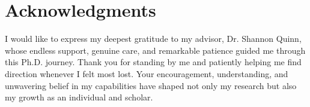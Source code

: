 \documentclass[./dissertation.tex]{subfiles}
\begin{document}
\chapter*{Acknowledgments}

I would like to express my deepest gratitude to my advisor, Dr. Shannon Quinn, whose endless support, genuine care, and remarkable patience guided me through this Ph.D. journey. Thank you for standing by me and patiently helping me find direction whenever I felt most lost. Your encouragement, understanding, and unwavering belief in my capabilities have shaped not only my research but also my growth as an individual and scholar.


\end{document}
